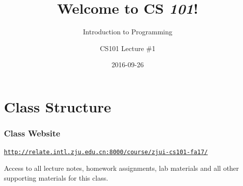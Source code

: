 \documentclass[11pt]{beamer}
\title{Welcome to CS \emph{101}!}
\subtitle{Introduction to Programming}
\author{CS101 Lecture \#1}
\date{2016-09-26}
\begin{document}

\newcommand{\Enlarge}{\large}
\newcommand{\CSBase}{blue}
\newcommand{\CSGradBot}{orange}
\newcommand{\CSAltDark}{black}
\newcommand{\CSPureBase}{blue}

\newcommand{\myitem}{\item}
\newcommand{\mysubitem}{\item}


\frame{\titlepage}

\setcounter{framenumber}{0}

\section{Class Structure}

\begin{frame}[plain,c]
  \frametitle{Class Website}
  \Enlarge

  \begin{center}
    \textcolor{\CSBase}{\small \texttt{\url{http://relate.intl.zju.edu.cn:8000/course/zjui-cs101-fa17/}}}

    Access to all lecture notes, homework assignments, lab materials and all other supporting materials for this class.
  \end{center}
\end{frame}
\end{document}
